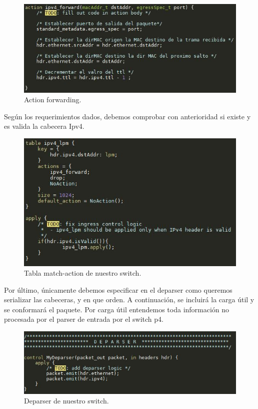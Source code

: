 \begin{figure}[!htb]
  \centering
    \includegraphics[width=0.8\linewidth]{./img/test/3.JPG}
    \caption{Action forwarding.}
  \label{fig:yo}
\end{figure}
\newline
Según los requerimientos dados, debemos comprobar con anterioridad si existe y es valida la cabecera Ipv4.
\newpage
\begin{figure}[!htb]
  \centering
    \includegraphics[width=0.7\linewidth]{./img/test/4.JPG}
    \caption{Tabla match-action de nuestro switch.}
  \label{fig:yo}
\end{figure}
Por último, únicamente debemos especificar en el deparser como queremos serializar las cabeceras, y en que orden. A continuación, se incluirá la carga útil y se conformará el paquete. Por carga útil entendemos toda información no procesada por el parser de entrada por el switch p4.
\begin{figure}[!htb]
  \centering
    \includegraphics[width=0.8\linewidth]{./img/test/5.JPG}
    \caption{Deparser de nuestro switch.}
  \label{fig:yo}
\end{figure}
\newline
\newline
